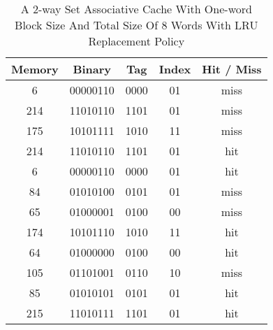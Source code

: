 \documentclass[10pt]{extarticle}
\begin{document}
\begin{enumerate}
\begin{enumerate}
            \begin{table}[h]
                \centering
                \caption{A 2-way Set Associative Cache With One-word Block Size
                And Total Size Of 8 Words With LRU Replacement Policy}
                \begin{tabular*}{300pt}{@{\extracolsep{\fill}} ccccc}
                    \textbf{Memory} & \textbf{Binary} & \textbf{Tag} &
                    \textbf{Index} & \textbf{Hit / Miss} \\
                    \hline
                    6   & 00000110 & 0000 & 01 & miss   \\
                    214 & 11010110 & 1101 & 01 & miss   \\
                    175 & 10101111 & 1010 & 11 & miss   \\
                    214 & 11010110 & 1101 & 01 & hit    \\
                    6   & 00000110 & 0000 & 01 & hit    \\
                    84  & 01010100 & 0101 & 01 & miss   \\
                    65  & 01000001 & 0100 & 00 & miss   \\
                    174 & 10101110 & 1010 & 11 & hit    \\
                    64  & 01000000 & 0100 & 00 & hit    \\
                    105 & 01101001 & 0110 & 10 & miss   \\
                    85  & 01010101 & 0101 & 01 & hit    \\
                    215 & 11010111 & 1101 & 01 & hit    \\
                \end{tabular*}
            \end{table}
            \newpage

        \end{enumerate}

    \end{enumerate}
\end{document}

